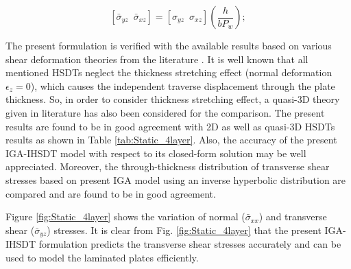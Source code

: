 \documentclass[3p,preprint,12pt]{elsarticle}
\begin{document}
\[
\left[\bar{\sigma}_{yz}\,\,\,\bar{\sigma}_{xz}\right]=\left[\sigma_{yz}\,\,\,\sigma_{xz}\right]\left(\frac{h}{bP_{w}}\right);
\]

{\color{purple}The present formulation is verified with the available results based on various shear deformation theories from the literature \cite{mantari2012new, karama2009new, reddy1984simple, rodrigues2012radial, grover2013new}. It is well known that all mentioned HSDTs neglect the thickness stretching effect (normal deformation $\epsilon_z = 0$), which causes the independent traverse displacement through the plate thickness. So, in order to consider thickness stretching effect, a quasi-3D theory given in literature \cite{tran2018static} has also been considered for the comparison. The present results are found to be in good agreement with 2D as well as quasi-3D HSDTs results as shown in Table \ref{tab:Static_4layer}. Also, the accuracy of the present IGA-IHSDT model with respect to its closed-form solution may be well appreciated. Moreover, the through-thickness distribution of transverse shear stresses based on present IGA model using an inverse hyperbolic distribution are compared and are found to be in good agreement. 

Figure \ref{fig:Static_4layer} shows the variation of normal ($\bar{\sigma}_{xx}$) and transverse shear ($\bar{\sigma}_{yz}$) stresses. It is clear from Fig. \ref{fig:Static_4layer} that the present IGA-IHSDT formulation predicts the transverse shear stresses accurately and can be used to model the laminated plates efficiently.}
\end{document}
